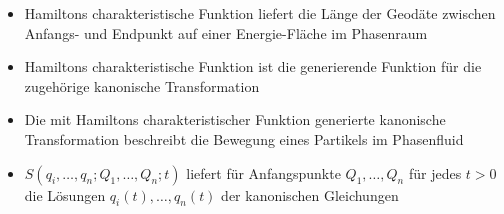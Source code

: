\begin{frame}
    \begin{itemize}
        \item Hamiltons charakteristische Funktion liefert die Länge der Geodäte zwischen Anfangs- und Endpunkt auf einer Energie-Fläche im Phasenraum
        \item Hamiltons charakteristische Funktion ist die generierende Funktion für die zugehörige kanonische Transformation
        \item Die mit Hamiltons charakteristischer Funktion generierte kanonische Transformation beschreibt die Bewegung eines Partikels im Phasenfluid
        \item $S(q_i,\ldots,q_n;Q_1,\ldots,Q_n;t)$ liefert für Anfangspunkte $Q_1,\ldots,Q_n$ für jedes $t>0$ die Lösungen $q_i(t),\ldots,q_n(t)$ der kanonischen Gleichungen 
     \end{itemize}
\end{frame}